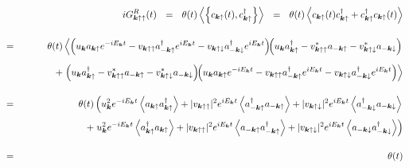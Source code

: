 \documentclass[uplatex,a4j,12pt,dvipdfmx]{jsarticle}
\begin{document}
\begin{eqnarray}
	&&
	i
	G_{\bm{k} \uparrow \uparrow}^{R}(t)
	\ \ = \ \
	\theta(t)
	\left\langle \left\{
	c_{\bm{k} \uparrow}(t), c_{\bm{k} \uparrow}^{\dagger}
	\right\} \right\rangle
	\ \ = \ \
	\theta(t)
	\left\langle
	c_{\bm{k} \uparrow}(t) c_{\bm{k} \uparrow}^{\dagger}
	+
	c_{\bm{k} \uparrow}^{\dagger} c_{\bm{k} \uparrow}(t)
	\right\rangle
	\nonumber \\[4mm] &=&
	\theta(t)
	\left\langle
	\left(
	u_{\bm{k}} a_{\bm{k} \uparrow} e^{- i E_{\bm{k}} t}
	-
	v_{\bm{k} \uparrow \uparrow} a_{-\bm{k} \uparrow}^{\dagger} e^{ i E_{\bm{k}} t}
	-
	v_{\bm{k} \uparrow \downarrow} a_{-\bm{k} \downarrow}^{\dagger} e^{ i E_{\bm{k}} t}
	\right)
	\!\!
	\left(
	u_{\bm{k}} a_{\bm{k} \uparrow}^{\dagger}
	-
	v_{\bm{k} \uparrow \uparrow}^{*} a_{-\bm{k} \uparrow}
	-
	v_{\bm{k} \uparrow \downarrow}^{*} a_{-\bm{k} \downarrow}
	\right)
	\right.
	\nonumber \\[2mm] && \hspace{12mm} +
	\left.
	\left(
	u_{\bm{k}} a_{\bm{k} \uparrow}^{\dagger}
	-
	v_{\bm{k} \uparrow \uparrow}^{*} a_{-\bm{k} \uparrow}
	-
	v_{\bm{k} \uparrow \downarrow}^{*} a_{-\bm{k} \downarrow}
	\right)
	\!\!
	\left(
	u_{\bm{k}} a_{\bm{k} \uparrow} e^{- i E_{\bm{k}} t}
	-
	v_{\bm{k} \uparrow \uparrow} a_{-\bm{k} \uparrow}^{\dagger} e^{ i E_{\bm{k}} t}
	-
	v_{\bm{k} \uparrow \downarrow} a_{-\bm{k} \downarrow}^{\dagger} e^{ i E_{\bm{k}} t}
	\right)
	\right\rangle
	\nonumber \\[4mm]
	&=&
	\theta(t)
	\left(
	u_{\bm{k}}^{2}
	e^{ - i E_{\bm{k}} t }
	\left\langle
	a_{\bm{k} \uparrow}
	a_{\bm{k} \uparrow}^{\dagger}
	\right\rangle
	+
	|v_{\bm{k} \uparrow \uparrow}|^{2}
	e^{ i E_{\bm{k}} t }
	\left\langle
	a_{-\bm{k} \uparrow}^{\dagger}
	a_{-\bm{k} \uparrow}
	\right\rangle
	+
	|v_{\bm{k} \uparrow \downarrow}|^{2}
	e^{ i E_{\bm{k}} t }
	\left\langle
	a_{-\bm{k} \downarrow}^{\dagger}
	a_{-\bm{k} \downarrow}
	\right\rangle
	\right.
	\nonumber \\[1mm] && \hspace{12mm} +
	\left.
	u_{\bm{k}}^{2}
	e^{ - i E_{\bm{k}} t }
	\left\langle
	a_{\bm{k} \uparrow}^{\dagger}
	a_{\bm{k} \uparrow}
	\right\rangle
	+
	|v_{\bm{k} \uparrow \uparrow}|^{2}
	e^{ i E_{\bm{k}} t }
	\left\langle
	a_{-\bm{k} \uparrow}
	a_{-\bm{k} \uparrow}^{\dagger}
	\right\rangle
	+
	|v_{\bm{k} \uparrow \downarrow}|^{2}
	e^{ i E_{\bm{k}} t }
	\left\langle
	a_{-\bm{k} \downarrow}
	a_{-\bm{k} \downarrow}^{\dagger}
	\right\rangle
	\right)
	\nonumber \\[4mm]
	&=&
	\theta(t)

\end{eqnarray}
\end{document}

